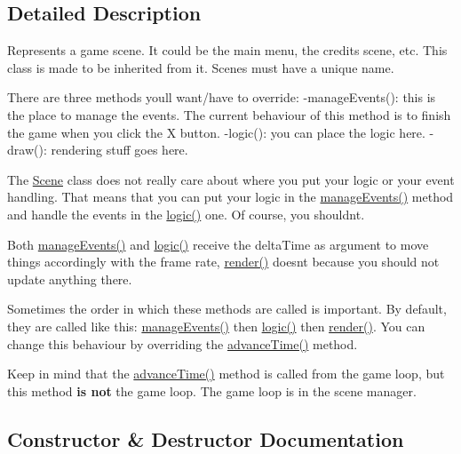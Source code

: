 \subsection{Detailed Description}
Represents a game scene. It could be the main menu, the credits scene, etc. This class is made to be inherited from it. Scenes must have a unique name. 

There are three methods you\textquotesingle{}ll want/have to override\+: -\/manage\+Events()\+: this is the place to manage the events. The current behaviour of this method is to finish the game when you click the X button. -\/logic()\+: you can place the logic here. -\/draw()\+: rendering stuff goes here.

The \hyperlink{classzt_1_1_scene}{Scene} class does not really care about where you put your logic or your event handling. That means that you can put your logic in the \hyperlink{classzt_1_1_scene_ac450fd3460c158c0a3f2661df0410477}{manage\+Events()} method and handle the events in the \hyperlink{classzt_1_1_scene_a1150eb60893f3077ecacf94b309414bf}{logic()} one. Of course, you shouldn\textquotesingle{}t.

Both \hyperlink{classzt_1_1_scene_ac450fd3460c158c0a3f2661df0410477}{manage\+Events()} and \hyperlink{classzt_1_1_scene_a1150eb60893f3077ecacf94b309414bf}{logic()} receive the delta\+Time as argument to move things accordingly with the frame rate, \hyperlink{classzt_1_1_scene_aa554c0468228aa1aab7e553c52c7b0d4}{render()} doesn\textquotesingle{}t because you should not update anything there.

Sometimes the order in which these methods are called is important. By default, they are called like this\+: \hyperlink{classzt_1_1_scene_ac450fd3460c158c0a3f2661df0410477}{manage\+Events()} then \hyperlink{classzt_1_1_scene_a1150eb60893f3077ecacf94b309414bf}{logic()} then \hyperlink{classzt_1_1_scene_aa554c0468228aa1aab7e553c52c7b0d4}{render()}. You can change this behaviour by overriding the \hyperlink{classzt_1_1_scene_ac5440bbe62a44eda2d4b3d1dde5d3d6a}{advance\+Time()} method.

Keep in mind that the \hyperlink{classzt_1_1_scene_ac5440bbe62a44eda2d4b3d1dde5d3d6a}{advance\+Time()} method is called from the game loop, but this method {\bfseries is not} the game loop. The game loop is in the scene manager. 

\subsection{Constructor \& Destructor Documentation}
\mbox{\label{classzt_1_1_scene_af30ef0d6fa9fcdbada43d51f594b1f09}} 
